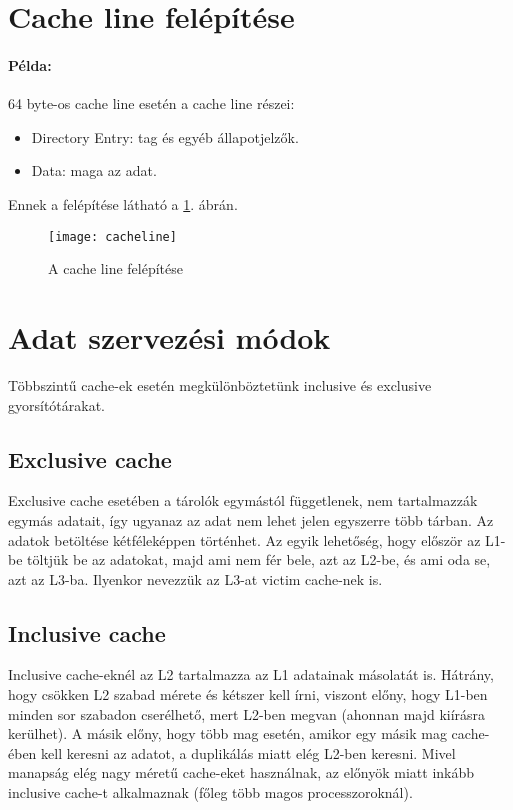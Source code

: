 \section{Cache line felépítése}
\paragraph{Példa:} 64 byte-os cache line esetén a cache line részei:
\begin{itemize}
    \item Directory Entry: tag és egyéb állapotjelzők.
    \item Data: maga az adat.
\end{itemize}
Ennek a felépítése látható a \ref{fig:cacheline}. ábrán.
\begin{figure}[H]
    \texttt{[image: cacheline]}
    \centering
    \caption{A cache line felépítése}
    \label{fig:cacheline}
\end{figure}

\section{Adat szervezési módok}
Többszintű cache-ek esetén megkülönböztetünk inclusive és exclusive gyorsítótárakat.

\subsection{Exclusive cache}
Exclusive cache esetében a tárolók egymástól függetlenek, nem tartalmazzák egymás adatait, így ugyanaz az adat nem lehet jelen egyszerre több tárban.
Az adatok betöltése kétféleképpen történhet.
Az egyik lehetőség, hogy először az L1-be töltjük be az adatokat, majd ami nem fér bele, azt az L2-be, és ami oda se, azt az L3-ba.
Ilyenkor nevezzük az L3-at victim cache-nek is.

\subsection{Inclusive cache}
Inclusive cache-eknél az L2 tartalmazza az L1 adatainak másolatát is.
Hátrány, hogy csökken L2 szabad mérete és kétszer kell írni, viszont előny, hogy L1-ben minden sor szabadon cserélhető, mert L2-ben megvan (ahonnan majd kiírásra kerülhet).
A másik előny, hogy több mag esetén, amikor egy másik mag cache-ében kell keresni az adatot, a duplikálás miatt elég L2-ben keresni.
Mivel manapság elég nagy méretű cache-eket használnak, az előnyök miatt inkább inclusive cache-t alkalmaznak (főleg több magos processzoroknál).

